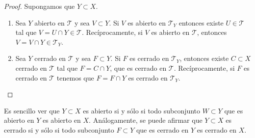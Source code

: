 \begin{proof}
	Supongamos que $\displaystyle Y \subset X $. 
	\begin{enumerate}
	\item Sea $\displaystyle Y $ abierto en $\displaystyle \mathcal{T} $ y sea $\displaystyle V \subset Y $. Si $\displaystyle V $ es abierto en $\displaystyle \mathcal{T}_{Y} $ entonces existe $\displaystyle U \in \mathcal{T} $ tal que $\displaystyle V = U \cap Y \in \mathcal{T} $. Recíprocamente, si $\displaystyle V $ es abierto en $\displaystyle \mathcal{T} $, entonces $\displaystyle V = V \cap Y \in \mathcal{T}_{Y} $. 
	\item Sea $\displaystyle Y $ cerrado en $\displaystyle \mathcal{T} $ y sea $\displaystyle F \subset Y $. Si $\displaystyle F $ es cerrado en $\displaystyle \mathcal{T}_{Y} $, entonces existe $\displaystyle C \subset X $ cerrado en $\displaystyle \mathcal{T} $ tal que $\displaystyle F = C \cap Y $, que es cerrado en $\displaystyle \mathcal{T} $. Recíprocamente, si $\displaystyle F $ es cerrado en $\displaystyle \mathcal{T} $ tenemos que $\displaystyle F = F \cap Y $ es cerrado en $\displaystyle \mathcal{T}_{Y} $. 
	\end{enumerate}
\end{proof}
\begin{observation}
Es sencillo ver que $\displaystyle Y \subset X $ es abierto si y sólo si todo subconjunto $\displaystyle W \subset Y $ que es abierto en $\displaystyle Y $ es abierto en $\displaystyle X $. Análogamente, se puede afirmar que $\displaystyle Y \subset X $ es cerrado si y sólo si todo subconjunto $\displaystyle F \subset Y $ que es cerrado en $\displaystyle Y $ es cerrado en $\displaystyle X $. 
\end{observation}

